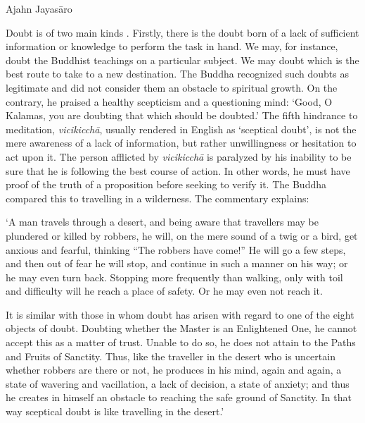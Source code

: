 
Ajahn Jayasāro

Doubt is of two main kinds . Firstly, there is the doubt born of a lack
of sufficient information or knowledge to perform the task in hand. We
may, for instance, doubt the Buddhist teachings on a particular subject.
We may doubt which is the best route to take to a new destination. The
Buddha recognized such doubts as legitimate and did not consider them an
obstacle to spiritual growth. On the contrary, he praised a healthy
scepticism and a questioning mind: `Good, O Kalamas, you are doubting
that which should be doubted.' The fifth hindrance to meditation,
\emph{vicikicchā}, usually rendered in English as `sceptical doubt', is
not the mere awareness of a lack of information, but rather
unwillingness or hesitation to act upon it. The person afflicted by
\emph{vicikicchā} is paralyzed by his inability to be sure that he is
following the best course of action. In other words, he must have proof
of the truth of a proposition before seeking to verify it. The Buddha
compared this to travelling in a wilderness. The commentary explains:

`A man travels through a desert, and being aware that travellers may be
plundered or killed by robbers, he will, on the mere sound of a twig or
a bird, get anxious and fearful, thinking ``The robbers have come!'' He
will go a few steps, and then out of fear he will stop, and continue in
such a manner on his way; or he may even turn back. Stopping more
frequently than walking, only with toil and difficulty will he reach a
place of safety. Or he may even not reach it.

It is similar with those in whom doubt has arisen with regard to one of
the eight objects of doubt. Doubting whether the Master is an
Enlightened One, he cannot accept this as a matter of trust. Unable to
do so, he does not attain to the Paths and Fruits of Sanctity. Thus,
like the traveller in the desert who is uncertain whether robbers are
there or not, he produces in his mind, again and again, a state of
wavering and vacillation, a lack of decision, a state of anxiety; and
thus he creates in himself an obstacle to reaching the safe ground of
Sanctity. In that way sceptical doubt is like travelling in the desert.'

